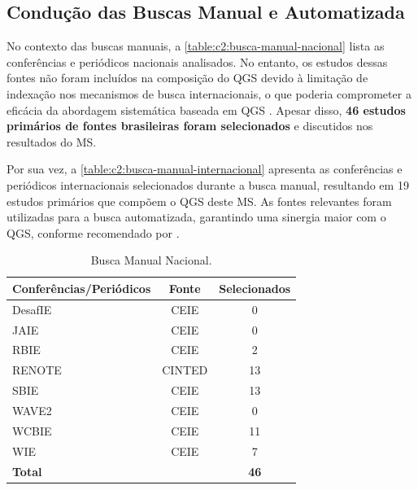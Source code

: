 \subsection{Condução das Buscas Manual e Automatizada}
\label{ms:conducao-busca-manual}

No contexto das buscas manuais, a \autoref{table:c2:busca-manual-nacional} lista as conferências e periódicos nacionais analisados. No entanto, os estudos dessas fontes não foram incluídos na composição do QGS devido à limitação de indexação nos mecanismos de busca internacionais, o que poderia comprometer a eficácia da abordagem sistemática baseada em QGS \cite{Zhang2011}. Apesar disso, \textbf{46 estudos primários de fontes brasileiras foram selecionados} e discutidos nos resultados do MS. 

Por sua vez, a \autoref{table:c2:busca-manual-internacional} apresenta as conferências e periódicos internacionais selecionados durante a busca manual, resultando em 19 estudos primários que compõem o QGS deste MS. As fontes relevantes foram utilizadas para a busca automatizada, garantindo uma sinergia maior com o QGS, conforme recomendado por .

\begin{table}[htb]
\centering
\caption{Busca Manual Nacional.}
\label{table:c2:busca-manual-nacional}
\begin{tabular}{l|c|c} \hline
\textbf{Conferências/Periódicos} & \textbf{Fonte} & \textbf{Selecionados} \\ \hline
DesafIE                          & CEIE           & 0                     \\
JAIE                             & CEIE           & 0                     \\
RBIE                             & CEIE           & 2                     \\
RENOTE                           & CINTED         & 13                    \\
SBIE                             & CEIE           & 13                    \\
WAVE2                            & CEIE           & 0                     \\
WCBIE                            & CEIE           & 11                    \\
WIE                              & CEIE           & 7                     \\ \hline
\multicolumn{2}{l}{\textbf{Total}}                & \textbf{46}           \\ \hline
\end{tabular}
\end{table}

